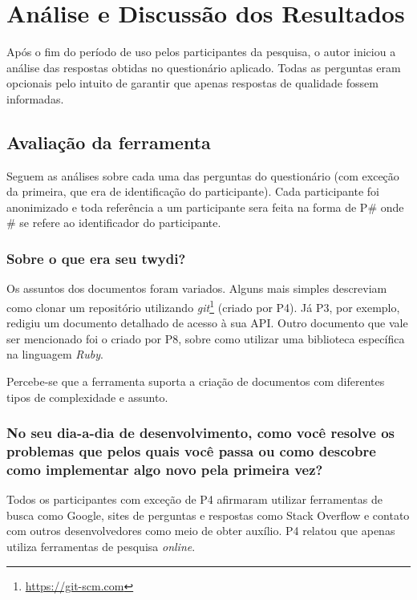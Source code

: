 \chapter{Análise e Discussão dos Resultados}

Após o fim do período de uso pelos participantes da pesquisa, o autor iniciou a análise das respostas obtidas no questionário aplicado. Todas as perguntas eram opcionais pelo intuito de garantir que apenas respostas de qualidade fossem informadas.

\section{Avaliação da ferramenta}

Seguem as análises sobre cada uma das perguntas do questionário (com exceção da primeira, que era de identificação do participante). Cada participante foi anonimizado e toda referência a um participante sera feita na forma de P\# onde \# se refere ao identificador do participante.

\subsection{Sobre o que era seu twydi?}

Os assuntos dos documentos foram variados. Alguns mais simples descreviam como clonar um repositório utilizando \textit{git}\footnote{\url{https://git-scm.com}} (criado por P4). Já P3, por exemplo, redigiu um documento detalhado de acesso à sua API. Outro documento que vale ser mencionado foi o criado por P8, sobre como utilizar uma biblioteca específica na linguagem \textit{Ruby}.

Percebe-se que a ferramenta suporta a criação de documentos com diferentes tipos de complexidade e assunto.

\subsection{No seu dia-a-dia de desenvolvimento, como você resolve os problemas que pelos quais você passa ou como descobre como implementar algo novo pela primeira vez?}

Todos os participantes com exceção de P4 afirmaram utilizar ferramentas de busca como Google, sites de perguntas e respostas como Stack Overflow e contato com outros desenvolvedores como meio de obter auxílio. P4 relatou que apenas utiliza ferramentas de pesquisa \textit{online}.

